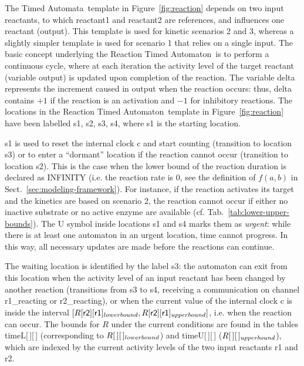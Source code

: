 \documentclass[journal, 10pt]{IEEEtran}
\def\ta{Timed Automaton}
\def\tas{Timed Automata}
\begin{document}
The \tas\ template in Figure~\ref{fig:reaction} depends on two input reactants, to which {\sf reactant1} and {\sf reactant2}
are references, and influences one reactant ({\sf output}). This template is used for kinetic scenarios 2 and 3, whereas
a slightly simpler template is used for scenario 1 that relies on a single input.
The basic concept underlying the Reaction \ta\ is to perform a continuous cycle, where at each iteration
 the activity level of the target reactant (variable {\sf output}) is updated upon completion of the reaction.
The variable {\sf delta} represents the increment caused in {\sf output} when the reaction occurs: thus, {\sf delta} contains
$+1$ if the reaction is an activation and $-1$ for inhibitory reactions.
The locations in the Reaction \ta\ template in Figure~\ref{fig:reaction} have been labelled {\sf s1, s2, s3, s4}, where
{\sf s1} is the starting location.


{\sf s1} is used to reset the internal clock {\sf c} and start
counting (transition to location {\sf s3}) or to enter a ``dormant'' location if the reaction cannot occur
(transition to location {\sf s2}). This is the case when the lower bound of the reaction duration
is declared as {\sf INFINITY} (i.e. the reaction rate is 0, see the definition of $f(a, b)$ in Sect.~\ref{sec:modeling-framework}). %
For instance, if the reaction activates its target and the kinetics are based on scenario 2,
the reaction cannot occur if either no inactive substrate or no active enzyme are available (cf. Tab.~\ref{tab:lower-upper-bounds}).
The {\sf U} symbol inside locations {\sf s1} and {\sf s4} marks them as \emph{urgent}:
while there is at least one automaton in an urgent location, time cannot progress. In this way,
all necessary updates are made before the reactions can continue.

The waiting location is identified by the label {\sf s3}: the automaton can exit from
this location when the activity level of an input reactant has been changed by another reaction (transitions from {\sf s3} to
{\sf s4}, receiving a communication on channel {\sf r1\_{}reacting} or {\sf r2\_{}reacting}), or when the current value
of the internal clock {\sf c} is inside the interval
$[R[\mbox{\sf r2}][\mbox{\sf r1}]_{\mbox{\scriptsize lower bound}}, R[\mbox{\sf r2}][\mbox{\sf r1}]_{\mbox{\scriptsize upper bound}}]$,
i.e. when the reaction can occur. The bounds for $R$ under the current conditions are found in the
tables {\sf timeL[\,][\,]} (corresponding to $R[\,][\,]_{\mbox{\scriptsize lower bound}}$)
and {\sf timeU[\,][\,]} ($R[\,][\,]_{\mbox{\scriptsize upper bound}}$),
which are indexed by the current activity levels of the two input reactants {\sf r1} and {\sf r2}.
\end{document}

